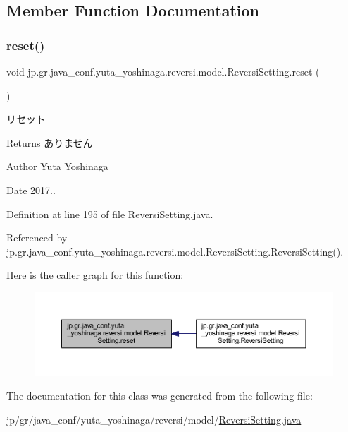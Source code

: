 \subsection{Member Function Documentation}
\mbox{\label{classjp_1_1gr_1_1java__conf_1_1yuta__yoshinaga_1_1reversi_1_1model_1_1_reversi_setting_afef8530666d1ce3522fd53938cd00353}} 
\subsubsection{\texorpdfstring{reset()}{reset()}}
{\footnotesize\ttfamily void jp.\+gr.\+java\+\_\+conf.\+yuta\+\_\+yoshinaga.\+reversi.\+model.\+Reversi\+Setting.\+reset (\begin{DoxyParamCaption}{ }\end{DoxyParamCaption})}



リセット 

\begin{DoxyReturn}{Returns}
ありません 
\end{DoxyReturn}
\begin{DoxyAuthor}{Author}
Yuta Yoshinaga 
\end{DoxyAuthor}
\begin{DoxyDate}{Date}
2017.. 
\end{DoxyDate}


Definition at line 195 of file Reversi\+Setting.\+java.



Referenced by jp.\+gr.\+java\+\_\+conf.\+yuta\+\_\+yoshinaga.\+reversi.\+model.\+Reversi\+Setting.\+Reversi\+Setting().

Here is the caller graph for this function\+:\nopagebreak
\begin{figure}[H]
\begin{center}
\leavevmode
\includegraphics[width=350pt]{classjp_1_1gr_1_1java__conf_1_1yuta__yoshinaga_1_1reversi_1_1model_1_1_reversi_setting_afef8530666d1ce3522fd53938cd00353_icgraph}
\end{center}
\end{figure}


The documentation for this class was generated from the following file\+:\begin{DoxyCompactItemize}
\item 
jp/gr/java\+\_\+conf/yuta\+\_\+yoshinaga/reversi/model/\mbox{\hyperlink{_reversi_setting_8java}{Reversi\+Setting.\+java}}\end{DoxyCompactItemize}
